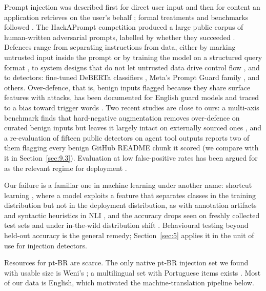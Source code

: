 \documentclass[11pt]{article}
\begin{document}
Prompt injection was described first for direct user input \citep{perez2022ignore} and then for content an application retrieves on the user's behalf \citep{greshake2023indirect}; formal treatments and benchmarks followed \citep{liu2024formalizing, yi2023bipia, zhan2024injecagent, debenedetti2024agentdojo}. The HackAPrompt competition produced a large public corpus of human-written adversarial prompts, labelled by whether they succeeded \citep{schulhoff2023hackaprompt}. Defences range from separating instructions from data, either by marking untrusted input inside the prompt \citep{hines2024spotlighting} or by training the model on a structured query format \citep{chen2024struq}, to system designs that do not let untrusted data drive control flow \citep{debenedetti2025camel}, and to detectors: fine-tuned DeBERTa classifiers \citep{protectai2024deberta, deepset2023deberta}, Meta's Prompt Guard family \citep{meta2024promptguard, meta2025promptguard2}, and others. Over-defence, that is, benign inputs flagged because they share surface features with attacks, has been documented for English guard models and traced to a bias toward trigger words \citep{li2024injecguard, li2025piguard}. Two recent studies are close to ours: a multi-axis benchmark finds that hard-negative augmentation removes over-defence on curated benign inputs but leaves it largely intact on externally sourced ones \citep{shire2026pidsbench}, and a re-evaluation of fifteen public detectors on agent tool outputs reports two of them flagging every benign GitHub README chunk it scored \citep{liu2026passing} (we compare with it in Section~\ref{sec:9.3}). Evaluation at low false-positive rates has been argued for as the relevant regime for deployment \citep{jacob2025promptshield, liu2026passing}. %

Our failure is a familiar one in machine learning under another name: shortcut learning \citep{geirhos2020shortcut}, where a model exploits a feature that separates classes in the training distribution but not in the deployment distribution, as with annotation artifacts and syntactic heuristics in NLI \citep{gururangan2018annotation, mccoy2019right}, and the accuracy drops seen on freshly collected test sets and under in-the-wild distribution shift \citep{recht2019imagenet, koh2021wilds}. Behavioural testing beyond held-out accuracy \citep{ribeiro2020checklist} is the general remedy; Section~\ref{sec:5} applies it in the unit of use for injection detectors.

Resources for pt-BR are scarce. The only native pt-BR injection set we found with usable size is Weni's \citep{weni2024promptinjections}; a multilingual set with Portuguese items exists \citep{rikka2025multilingual}. Most of our data is English, which motivated the machine-translation pipeline below.
\end{document}
